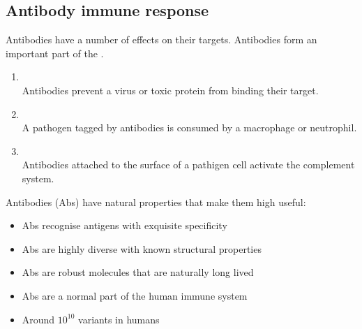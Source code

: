 \subsection{Antibody immune response}
Antibodies have a number of effects on their targets. Antibodies form an important part of the .
\begin{enumerate}
    \item {} \\ Antibodies prevent a virus or toxic protein from binding their target.
    \item {} \\ A pathogen tagged by antibodies is consumed by a macrophage or neutrophil.
    \item {} \\ Antibodies attached to the surface of a pathigen cell activate the complement system.
\end{enumerate}
Antibodies (Abs) have natural properties that make them high useful:
\begin{itemize}
    \item Abs recognise antigens with exquisite specificity
    \item Abs are highly diverse with known structural properties
    \item Abs are robust molecules that are naturally long lived
    \item Abs are a normal part of the human immune system
    \item Around $10^{10}$ variants in humans
\end{itemize}

